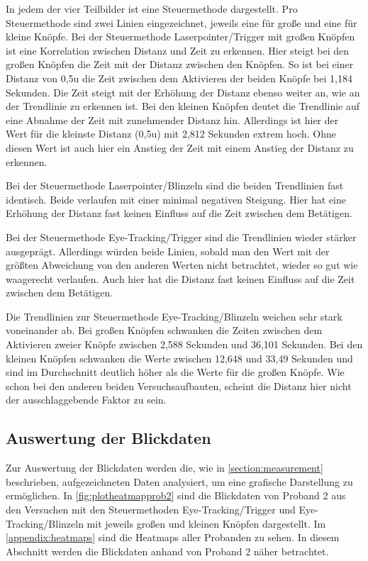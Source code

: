 In jedem der vier Teilbilder ist eine Steuermethode dargestellt. Pro Steuermethode sind zwei Linien eingezeichnet, jeweils eine für große und eine für kleine Knöpfe. Bei der Steuermethode Laserpointer/Trigger mit großen Knöpfen ist eine Korrelation zwischen Distanz und Zeit zu erkennen. Hier steigt bei den großen Knöpfen die Zeit mit der Distanz zwischen den Knöpfen. So ist bei einer Distanz von 0,5\ac{u} die Zeit zwischen dem Aktivieren der beiden Knöpfe bei 1,184 Sekunden. Die Zeit steigt mit der Erhöhung der Distanz ebenso weiter an, wie an der Trendlinie zu erkennen ist. Bei den kleinen Knöpfen deutet die Trendlinie auf eine Abnahme der Zeit mit zunehmender Distanz hin. Allerdings ist hier der Wert für die kleinste Distanz (0,5\ac{u}) mit 2,812 Sekunden extrem hoch. Ohne diesen Wert ist auch hier ein Anstieg der Zeit mit einem Anstieg der Distanz zu erkennen. 

Bei der Steuermethode Laserpointer/Blinzeln sind die beiden Trendlinien fast identisch. Beide verlaufen mit einer minimal negativen Steigung. Hier hat eine Erhöhung der Distanz fast keinen Einfluss auf die Zeit zwischen dem Betätigen.

Bei der Steuermethode Eye-Tracking/Trigger sind die Trendlinien wieder stärker ausgeprägt. Allerdings würden beide Linien, sobald man den Wert mit der größten Abweichung von den anderen Werten nicht betrachtet, wieder so gut wie waagerecht verlaufen. Auch hier hat die Distanz fast keinen Einfluss auf die Zeit zwischen dem Betätigen. 

Die Trendlinien zur Steuermethode Eye-Tracking/Blinzeln weichen sehr stark voneinander ab. Bei großen Knöpfen schwanken die Zeiten zwischen dem Aktivieren zweier Knöpfe zwischen 2,588 Sekunden und 36,101 Sekunden.  Bei den kleinen Knöpfen schwanken die Werte zwischen 12,648 und 33,49 Sekunden und sind im Durchschnitt deutlich höher als die Werte für die großen Knöpfe. Wie schon bei den anderen beiden Versuchsaufbauten, scheint die Distanz hier nicht der ausschlaggebende Faktor zu sein.

\subsection{Auswertung der Blickdaten}
Zur Auswertung der Blickdaten werden die, wie in \autoref{section:measurement} beschrieben, aufgezeichneten Daten analysiert, um eine grafische Darstellung zu ermöglichen. In \autoref{fig:plotheatmapprob2} sind die Blickdaten von Proband 2 aus den Versuchen mit den Steuermethoden Eye-Tracking/Trigger und Eye-Tracking/Blinzeln mit jeweils großen und kleinen Knöpfen dargestellt. Im \autoref{appendix:heatmaps} sind die Heatmaps aller Probanden zu sehen. In diesem Abschnitt werden die Blickdaten anhand von Proband 2 näher betrachtet. 

